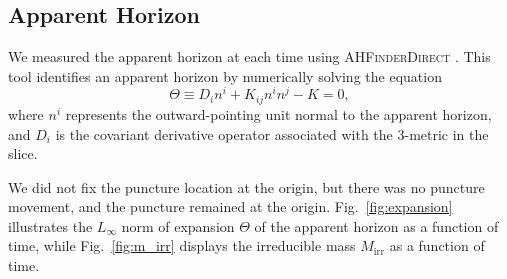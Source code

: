 \documentclass[%
 reprint,
 amsmath,amssymb,
 aps,
 prd,
]{revtex4-2}
\begin{document}
%
%
%
%

\subsection{Apparent Horizon}

We measured the apparent horizon at each time using \textsc{AHFinderDirect} \cite{Thornburg:1995cp, Thornburg:2003sf}. This tool identifies an apparent horizon by numerically solving the equation
\begin{equation}
	\Theta \equiv D_i n^i + K_{ij} n^i n^j - K = 0,
\end{equation}
where $n^i$ represents the outward-pointing unit normal to the apparent horizon, and $D_i$ is the covariant derivative operator associated with the 3-metric in the slice.

We did not fix the puncture location at the origin, but there was no puncture movement, and the puncture remained at the origin. Fig.~\ref{fig:expansion} illustrates the $L_\infty$ norm of expansion $\Theta$ of the apparent horizon as a function of time, while Fig.~\ref{fig:m_irr} displays the irreducible mass $M_\mathrm{irr}$ as a function of time.
\end{document}
